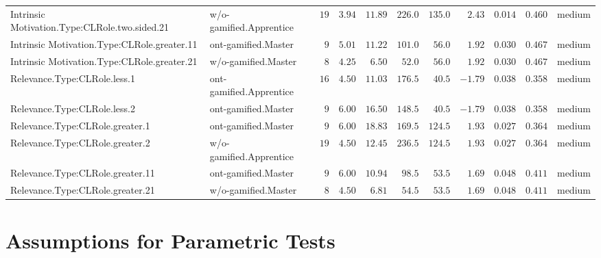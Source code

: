 \documentclass[6pt,a4paper]{article}
\begin{document}
\begin{landscape}
{\begin{longtable}{llrrrrrrrrl}
Intrinsic Motivation.Type:CLRole.two.sided.21&w/o-gamified.Apprentice&$19$&$3.94$&$11.89$&$226.0$&$135.0$&$ 2.43$&$0.014$&$0.460$&medium\tabularnewline
Intrinsic Motivation.Type:CLRole.greater.11&ont-gamified.Master&$ 9$&$5.01$&$11.22$&$101.0$&$ 56.0$&$ 1.92$&$0.030$&$0.467$&medium\tabularnewline
Intrinsic Motivation.Type:CLRole.greater.21&w/o-gamified.Master&$ 8$&$4.25$&$ 6.50$&$ 52.0$&$ 56.0$&$ 1.92$&$0.030$&$0.467$&medium\tabularnewline
Relevance.Type:CLRole.less.1&ont-gamified.Apprentice&$16$&$4.50$&$11.03$&$176.5$&$ 40.5$&$-1.79$&$0.038$&$0.358$&medium\tabularnewline
Relevance.Type:CLRole.less.2&ont-gamified.Master&$ 9$&$6.00$&$16.50$&$148.5$&$ 40.5$&$-1.79$&$0.038$&$0.358$&medium\tabularnewline
Relevance.Type:CLRole.greater.1&ont-gamified.Master&$ 9$&$6.00$&$18.83$&$169.5$&$124.5$&$ 1.93$&$0.027$&$0.364$&medium\tabularnewline
Relevance.Type:CLRole.greater.2&w/o-gamified.Apprentice&$19$&$4.50$&$12.45$&$236.5$&$124.5$&$ 1.93$&$0.027$&$0.364$&medium\tabularnewline
Relevance.Type:CLRole.greater.11&ont-gamified.Master&$ 9$&$6.00$&$10.94$&$ 98.5$&$ 53.5$&$ 1.69$&$0.048$&$0.411$&medium\tabularnewline
Relevance.Type:CLRole.greater.21&w/o-gamified.Master&$ 8$&$4.50$&$ 6.81$&$ 54.5$&$ 53.5$&$ 1.69$&$0.048$&$0.411$&medium\tabularnewline
\hline
\end{longtable}}

\end{landscape}

\section{Assumptions for Parametric Tests}
\end{document}
